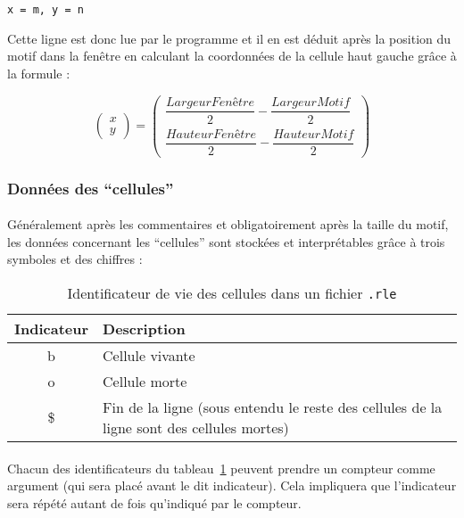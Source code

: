 \documentclass{report}
\begin{document}
\texttt{x = m, y = n}

Cette ligne est donc lue par le programme et il en est déduit après la position
du motif dans la fenêtre en calculant la coordonnées de la cellule haut gauche
grâce à la formule :

\begin{equation}
	\begin{pmatrix}
		x\\y
	\end{pmatrix}
	=
	\begin{pmatrix}
		\dfrac{LargeurFenêtre}{2} - \dfrac{LargeurMotif}{2}\\
		\dfrac{HauteurFenêtre}{2} - \dfrac{HauteurMotif}{2}
	\end{pmatrix}
\end{equation}

\subsubsection{Données des ``cellules''}

\paragraph{} Généralement après les commentaires et obligatoirement après la
taille du motif, les données concernant les ``cellules'' sont stockées et
interprétables grâce à trois symboles et des chiffres :

\begin{table}[h]
	\centering
	\begin{tabular}{|c|p{5cm}|}
		\hline
		\textbf{Indicateur} & \textbf{Description}\\
		\hline
		b & Cellule vivante\\
		\hline
		o & Cellule morte\\
		\hline
		\$ & Fin de la ligne (sous entendu le reste des cellules de la ligne
								sont des cellules mortes)\\
		\hline
	\end{tabular}
	\caption{Identificateur de vie des cellules dans un fichier \texttt{.rle}}
	\label{tab:rletags}
\end{table}

\paragraph{} Chacun des identificateurs du tableau~\ref{tab:rletags} peuvent
prendre un compteur comme argument (qui sera placé avant le dit indicateur).
Cela impliquera que l'indicateur sera répété autant de fois qu'indiqué par le
compteur.
\end{document}
